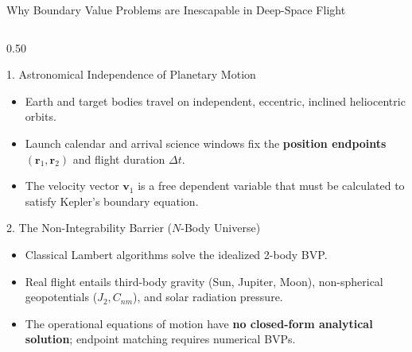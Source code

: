 \documentclass[aspectratio=169, 10pt]{beamer}
\begin{document}
\begin{frame}{Why Boundary Value Problems are Inescapable in Deep-Space Flight}
    \begin{columns}[t]
        \begin{column}{0.50\textwidth}
            \begin{block}{1. Astronomical Independence of Planetary Motion}
                \scriptsize
                \begin{itemize}\setlength{\itemsep}{1.5pt}
                    \item Earth and target bodies travel on independent, eccentric, inclined heliocentric orbits.
                    \item Launch calendar and arrival science windows fix the \textbf{position endpoints} $(\mathbf{r}_1, \mathbf{r}_2)$ and flight duration $\Delta t$.
                    \item The velocity vector $\mathbf{v}_1$ is a free dependent variable that must be calculated to satisfy Kepler's boundary equation.
                \end{itemize}
            \end{block}

            \vspace{-0.08cm}

            \begin{block}{2. The Non-Integrability Barrier ($N$-Body Universe)}
                \scriptsize
                \begin{itemize}\setlength{\itemsep}{1.5pt}
                    \item Classical Lambert algorithms solve the idealized 2-body BVP.
                    \item Real flight entails third-body gravity (Sun, Jupiter, Moon), non-spherical geopotentials ($J_2, C_{nm}$), and solar radiation pressure.
                    \item The operational equations of motion have \textbf{no closed-form analytical solution}; endpoint matching requires numerical BVPs.
                \end{itemize}
            \end{block}
        \end{column}


\end{columns}
\end{frame}
\end{document}
